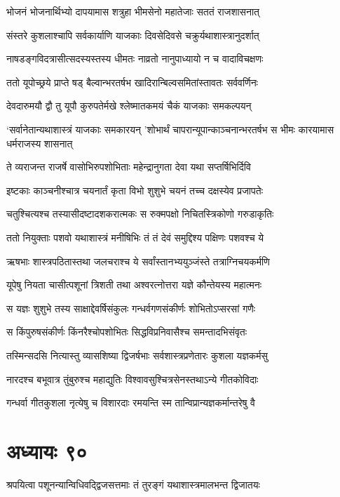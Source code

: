 \twolineshloka
{भोजनं भोजनार्थिभ्यो दापयामास शत्रुहा}
{भीमसेनो महातेजाः सततं राजशासनात्}


\twolineshloka
{संस्तरे कुशलाश्चापि सर्वकार्याणि याजकाः}
{दिवसेदिवसे चक्रुर्यथाशास्त्रानुदर्शात्}


\twolineshloka
{नाषडङ्गविदत्रासीत्सदस्यस्तस्य धीमतः}
{नाव्रतो नानुपाध्यायो न च वादाविचक्षणः}


\twolineshloka
{ततो यूपोच्छ्रये प्राप्ते षड् बैल्वान्भरतर्षभ}
{खादिरान्बिल्वसमितांस्तावतः सर्ववर्णिनः}


\twolineshloka
{देवदारुमयौ द्वौ तु यूपौ कुरुपतेर्मखे}
{श्लेष्मातकमयं चैकं याजकाः समकल्पयन्}


\threelineshloka
{`सर्वानेतान्यथाशास्त्रं याजकाः समकारयन्}
{'शोभार्थं चापरान्यूपान्काञ्चनान्भरतर्षभ}
{स भीमः कारयामास धर्मराजस्य शासनात्}


\twolineshloka
{ते व्यराजन्त राजर्षे वासोभिरुपशोभिताः}
{महेन्द्रानुगता देवा यथा सप्तर्षिभिर्दिवि}


\twolineshloka
{इष्टकाः काञ्चनीश्चात्र चयनार्तं कृता विभो}
{शुशुभे चयनं तच्च दक्षस्येव प्रजापतेः}


\twolineshloka
{चतुश्चित्यश्च तस्यासीदष्टादशकरात्मकः}
{स रुक्मपक्षो निचितस्त्रिकोणो गरुडाकृतिः}


\twolineshloka
{ततो नियुक्ताः पशवो यथाशास्त्रं मनीषिभिः}
{तं तं देवं समुद्दिश्य पक्षिणः पशवश्च ये}


\twolineshloka
{ऋषभाः शास्त्रपठितास्तथा जलचराश्च ये}
{सर्वांस्तानभ्ययुञ्जंस्ते तत्राग्निचयकर्मणि}


\twolineshloka
{यूपेषु नियता चासीत्पशूनां त्रिशती तथा}
{अश्वरत्नोत्तरा यज्ञे कौन्तेयस्य महात्मनः}


\twolineshloka
{स यज्ञः शुशुभे तस्य साक्षाद्देवर्षिसंकुलः}
{गन्धर्वगणसंकीर्णः शोभितोऽप्सरसां गणैः}


\twolineshloka
{स किंपुरुषसंकीर्णः किंनरैश्चोपशोभितः}
{सिद्धविप्रनिवासैश्च समन्तादभिसंवृतः}


\twolineshloka
{तस्मिन्सदसि नित्यास्तु व्यासशिष्या द्विजर्षभाः}
{सर्वशास्त्रप्रणेतारः कुशला यज्ञकर्मसु}


\twolineshloka
{नारदश्च बभूवात्र तुंबुरुश्च महाद्युतिः}
{विश्वावसुश्चित्रसेनस्तथाऽन्ये गीतकोविदाः}


\twolineshloka
{गन्धर्वा गीतकुशला नृत्येषु च विशारदाः}
{रमयन्ति स्म तान्विप्रान्यज्ञकर्मान्तरेषु वै}


\chapter{अध्यायः ९०}
\twolineshloka
{श्रपयित्वा पशूनन्यान्विधिवद्द्विजसत्तमाः}
{तं तुरङ्गं यथाशास्त्रमालभन्त द्विजातयः}


